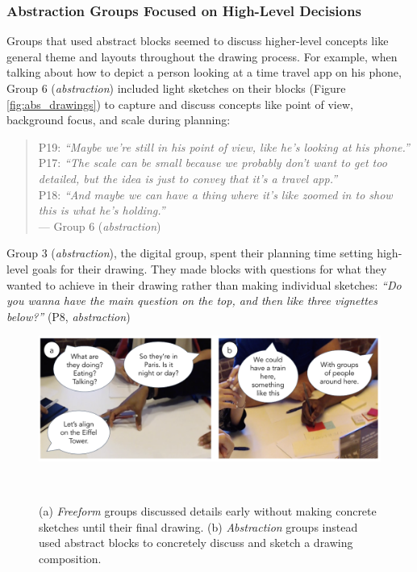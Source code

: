\subsubsection{Abstraction Groups Focused on High-Level Decisions}
Groups that used abstract blocks seemed to discuss higher-level concepts like general theme and layouts throughout the drawing process. For example, when talking about how to depict a person looking at a time travel app on his phone, Group 6 (\textit{abstraction}) included light sketches on their blocks (Figure \ref{fig:abs_drawings}) to capture and discuss concepts like point of view, background focus, and scale during planning:

\begin{quote}
    P19: \textit{``Maybe we're still in his point of view, like he's looking at his phone.''}\\
    P17: \textit{``The scale can be small because we probably don't want to get too detailed, but the idea is just to convey that it's a travel app.''}\\
    P18: \textit{``And maybe we can have a thing where it's like zoomed in to show this is what he's holding.''}\\
    --- Group 6 (\textit{abstraction})
\end{quote}

Group 3 (\textit{abstraction}), the digital group, spent their planning time setting high-level goals for their drawing. They made blocks with questions for what they wanted to achieve in their drawing rather than making individual sketches: \textit{``Do you wanna have the main question on the top, and then like three vignettes below?''} (P8, \textit{abstraction})

\begin{figure}[b!]
\centering
  \vspace{-0.25in}
  \includegraphics[width=.9\columnwidth]{abstraction/figures/planning.png}
  \caption{(a) \textit{Freeform} groups discussed details early without making concrete sketches until their final drawing. (b) \textit{Abstraction} groups instead used abstract blocks to concretely discuss and sketch a drawing composition.}~\label{fig:tangible}
  \vspace{-0.2in}
\end{figure}

